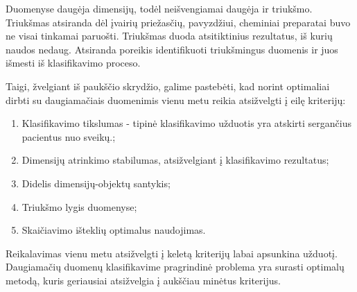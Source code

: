 Duomenyse daugėja dimensijų, todėl neišvengiamai daugėja ir triukšmo. 
Triukšmas atsiranda
dėl įvairių priežasčių, pavyzdžiui, cheminiai preparatai buvo ne visai tinkamai
paruošti. Triukšmas duoda atsitiktinius rezultatus, iš kurių naudos nedaug.
Atsiranda poreikis identifikuoti triukšmingus duomenis ir juos išmesti iš 
klasifikavimo proceso.

Taigi, žvelgiant iš paukščio skrydžio, galime pastebėti, kad norint optimaliai
dirbti su daugiamačiais duomenimis vienu metu reikia atsižvelgti į eilę kriterijų:
\begin{enumerate}
 \item Klasifikavimo tikslumas - tipinė klasifikavimo užduotis yra atskirti
 sergančius pacientus nuo sveikų.;
 \item Dimensijų atrinkimo stabilumas, atsižvelgiant į klasifikavimo rezultatus;
 \item Didelis dimensijų-objektų santykis;
 \item Triukšmo lygis duomenyse;
 \item Skaičiavimo išteklių optimalus naudojimas.
\end{enumerate}
Reikalavimas vienu metu atsižvelgti į keletą kriterijų labai apsunkina užduotį.
Daugiamačių duomenų klasifikavime pragrindinė problema yra surasti optimalų 
metodą, kuris geriausiai atsižvelgia į aukščiau minėtus kriterijus.

